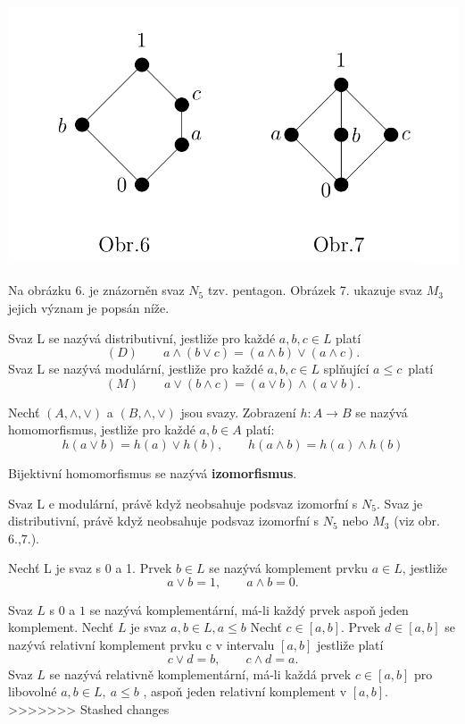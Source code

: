\includegraphics[scale=0.4]{img/M3aN5Svazy}

Na obrázku 6. je znázorněn svaz $N_5$ tzv. pentagon. Obrázek 7. ukazuje svaz $M_3$ jejich význam je popsán níže.

\begin{definition}
	Svaz L se nazývá distributivní, jestliže pro každé $a,b,c \in L$ platí $$(D)\qquad a \wedge (b \vee c) = (a \wedge b) \vee (a \wedge c).$$
	Svaz L se nazývá modulární, jestliže pro každé $a,b,c \in L$ splňující $a \leq c$ platí $$(M) \qquad a \vee (b \wedge c) = (a \vee b) \wedge (a \vee b).$$
\end{definition}

\begin{definition}
	Nechť $(A, \wedge, \vee)$ a $(B, \wedge, \vee)$ jsou svazy. Zobrazení $h: A \rightarrow B$ se nazývá homomorfismus, jestliže pro každé $a,b \in A$ platí: $$h(a \vee b) = h(a) \vee h(b), \qquad h(a \wedge b) = h(a) \wedge h(b)$$
\end{definition}
Bijektivní homomorfismus se nazývá \textbf{izomorfismus}.

\begin{sentence}
	Svaz L e modulární, právě když neobsahuje podsvaz izomorfní s $N_5$. Svaz je distributivní, právě když neobsahuje podsvaz izomorfní s $N_5$ nebo $M_3$ (viz obr. 6.,7.).  
\end{sentence}

\begin{definition}
	Nechť L je svaz s 0 a 1. Prvek $b \in L$ se nazývá komplement prvku $a \in L$, jestliže $$a \vee b = 1, \qquad a \wedge b = 0.$$
\end{definition}
Svaz $L$ s $0$ a $1$ se nazývá komplementární, má-li každý prvek aspoň jeden komplement.
Nechť $L$ je svaz $a,b \in L, a \leq b$ Nechť $c \in [a,b]$. Prvek $d \in [a,b]$ se nazývá relativní komplement prvku c v intervalu $[a, b]$ jestliže platí $$c \vee d = b, \qquad c \wedge d = a.$$
Svaz $L$ se nazývá relativně komplementární, má-li každá prvek $c \in [a,b]$ pro libovolné $a,b \in L,\ a \leq b$ , aspoň jeden relativní komplement v $[a,b]$.
>>>>>>> Stashed changes



